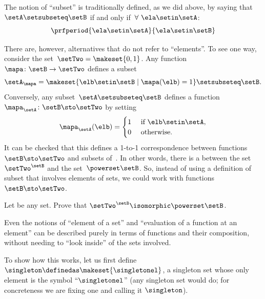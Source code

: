 {\begin{example}
    The notion of ``subset'' is traditionally defined, as we did above, by saying that~$\setA \setsubseteq \setB$ if and only if~$\forall \ \ela \setin\setA$:
    \begin{equation}
        \prfperiod{
            \ela \setin\setA
        }{
            \ela \setin\setB
        }
    \end{equation}

    There are, however, alternatives that do not refer to ``elements''.
    To see one way, consider the set~$\setTwo = \makeset{ 0, 1}$.
    Any function~$\mapa \colon \setB \to \setTwo$ defines a subset
    \begin{equation}
        \setA_\mapa = \makeset{ \elb \setin\setB \mid \mapa(\elb) = 1 } \setsubseteq \setB.
    \end{equation}
    Conversely, any subset~$\setA \setsubseteq \setB$ defines a function~$\mapa_\setA \colon \setB \sto \setTwo$ by setting
    \begin{equation}
        \mapa_\setA(\elb) = \begin{cases}
            1 & \text{ if } \elb\setin\setA, \\
            0 & \text{ otherwise}.
        \end{cases}
    \end{equation}
    It can be checked that this defines a 1-to-1 correspondence between functions~$\setB \sto \setTwo$ and subsets of~\setB.
    In other words, there is a  between the set~$\setTwo^\setB$ and the set~$\powerset \setB$.
    So, instead of using a definition of subset that involves elements of sets, we could work with functions~$\setB \sto \setTwo$.
\end{example}

\begin{gradedexercise}
    \label{ex:SubsetsAsFunctions}
    Let \setB be any set.
    Prove that $\setTwo^\setB \isomorphic \powerset \setB$.
\end{gradedexercise}


\begin{example}
    Even the notions of ``element of a set'' and ``evaluation of a function at an element'' can be described purely in terms of functions and their composition, without needing to ``look inside'' of the sets involved.

    To show how this works, let us first define $\singleton \definedas \makeset{\singletonel}$, a singleton set whose only element is the symbol ``$\singletonel$'' (any singleton set would do; for concreteness we are fixing one and calling it $\singleton$).


\end{example}}
